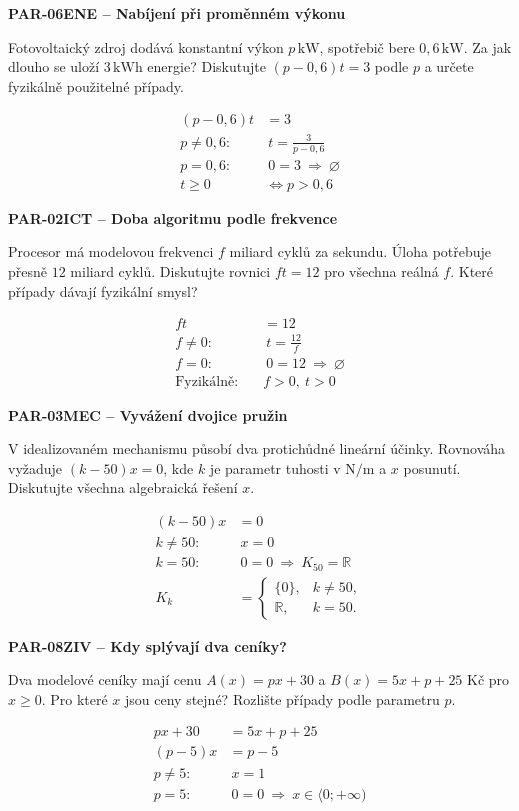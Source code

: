 \documentclass[11pt,a4paper]{article}
\begin{document}
\textbf{PAR-06}\quad\textbf{ENE -- Nabíjení při proměnném výkonu}\par
Fotovoltaický zdroj dodává konstantní výkon $p\,\mathrm{kW}$, spotřebič bere $0{,}6\,\mathrm{kW}$. Za jak dlouho se uloží $3\,\mathrm{kWh}$ energie? Diskutujte $(p-0{,}6)t=3$ podle $p$ a určete fyzikálně použitelné případy.
\par\[\begin{aligned}
(p-0{,}6)t&=3\\p\ne0{,}6:&\ t=\frac3{p-0{,}6}\\p=0{,}6:&\ 0=3\ \Rightarrow\ \varnothing\\t\ge0&\iff p>0{,}6
\end{aligned}\]
\par\medskip\noindent
\textbf{PAR-02}\quad\textbf{ICT -- Doba algoritmu podle frekvence}\par
Procesor má modelovou frekvenci $f$ miliard cyklů za sekundu. Úloha potřebuje přesně $12$ miliard cyklů. Diskutujte rovnici $ft=12$ pro všechna reálná $f$. Které případy dávají fyzikální smysl?
\par\[\begin{aligned}
ft&=12\\f\ne0:&\ t=\frac{12}{f}\\f=0:&\ 0=12\ \Rightarrow\ \varnothing\\\text{Fyzikálně:}\quad&f>0,\ t>0
\end{aligned}\]
\par\medskip\noindent
\textbf{PAR-03}\quad\textbf{MEC -- Vyvážení dvojice pružin}\par
V idealizovaném mechanismu působí dva protichůdné lineární účinky. Rovnováha vyžaduje $(k-50)x=0$, kde $k$ je parametr tuhosti v $\mathrm{N/m}$ a $x$ posunutí. Diskutujte všechna algebraická řešení $x$.
\par\[\begin{aligned}
(k-50)x&=0\\k\ne50:&\ x=0\\k=50:&\ 0=0\ \Rightarrow\ K_{50}=\mathbb R\\K_k&=\begin{cases}\{0\},&k\ne50,\\\mathbb R,&k=50.\end{cases}
\end{aligned}\]
\par\medskip\noindent
\textbf{PAR-08}\quad\textbf{ZIV -- Kdy splývají dva ceníky?}\par
Dva modelové ceníky mají cenu $A(x)=px+30$ a $B(x)=5x+p+25$ Kč pro $x\ge0$. Pro které $x$ jsou ceny stejné? Rozlište případy podle parametru $p$.
\par\[\begin{aligned}
px+30&=5x+p+25\\(p-5)x&=p-5\\p\ne5:&\ x=1\\p=5:&\ 0=0\ \Rightarrow\ x\in\langle0;+\infty)
\end{aligned}\]
\end{document}
